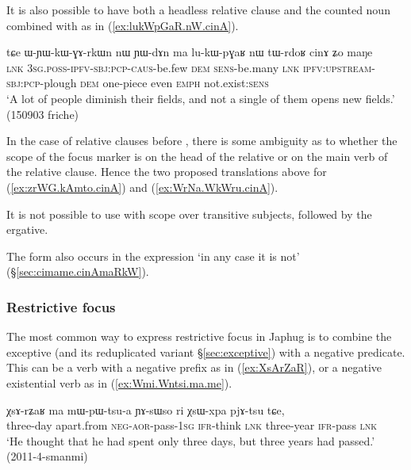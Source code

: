 It is also possible to have both a headless relative clause and the counted noun  combined with  as in (\ref{ex:lukWpGaR.nW.cinA}).

  \begin{exe}
\ex \label{ex:lukWpGaR.nW.cinA}
\gll tɕe ɯ-ɲɯ-kɯ-ɣɤ-rkɯn nɯ ɲɯ-dɤn ma lu-kɯ-pɣaʁ nɯ tɯ-rdoʁ cinɤ ʑo maŋe\\
\textsc{lnk} \textsc{3sg}.\textsc{poss}-\textsc{ipfv}-\textsc{sbj}:\textsc{pcp}-\textsc{caus}-be.few \textsc{dem} \textsc{sens}-be.many \textsc{lnk} \textsc{ipfv}:\textsc{upstream}-\textsc{sbj}:\textsc{pcp}-plough \textsc{dem} one-piece even \textsc{emph} not.exist:\textsc{sens}\\
\glt `A lot of people diminish their fields, and not a single of them opens new fields.' (150903 friche)
\end{exe}

In the case of relative clauses before , there is some ambiguity as to whether the scope of the focus marker is on the head of the relative or on the main verb of the relative clause. Hence the two proposed translations above for (\ref{ex:zrWG.kAmto.cinA}) and (\ref{ex:WrNa.WkWru.cinA}).

It is not possible to use  with scope over transitive subjects, followed by the ergative.


The form  also occurs in the expression  `in any case it is not' (§\ref{sec:cimame.cinAmaRkW}).


\subsubsection{Restrictive focus} \label{sec:restrictive.focus} 
 The most common way to express restrictive focus in Japhug is to combine the exceptive  (and its reduplicated variant  §\ref{sec:exceptive}) with a negative predicate. This can be a verb with a negative prefix as in (\ref{ex:XsArZaR}), or a negative existential verb as in (\ref{ex:Wmi.Wntsi.ma.me}).
 
 \begin{exe}
\ex  \label{ex:XsArZaR}
\gll   χsɤ-rʑaʁ ma mɯ-pɯ-tsu-a ɲɤ-sɯso ri χsɯ-xpa pjɤ-tsu tɕe,  \\
three-day apart.from \textsc{neg}-\textsc{aor}-pass-\textsc{1sg} \textsc{ifr}-think \textsc{lnk} three-year \textsc{ifr}-pass \textsc{lnk} \\
\glt `He thought that he had spent only three days, but three years had passed.' (2011-4-smanmi)
  \end{exe}
 
